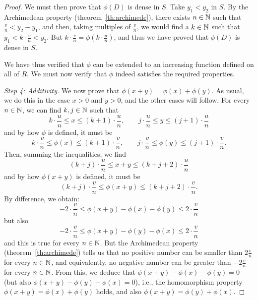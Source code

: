 \begin{proof}
We must then prove that $\phi(D)$ is dense in $S$. Take $y_1< y_2$ in $S$. By
the Archimedean property (theorem~\ref{th:archimede}), there exists $n\in {\mathbb N}$
such that $\frac v n < y_2-y_1$, and then, taking multiples of $\frac v n$, we
would find a $k\in{\mathbb N}$ such that $y_1 < k\cdot \frac v n < y_2$. But $k\cdot
\frac v n = \phi(k\cdot \frac u n)$, and thus we have proved that $\phi(D)$ is
dense in $S$.

We have thus verified that $\phi$ can be extended to an increasing function
defined on all of $R$. We must now verify that $\phi$ indeed satisfies the
required properties.


\emph{Step 4: Additivity.} We now prove that $\phi(x+y)=\phi(x)+\phi(y)$. As usual, we do this in the case $x>0$ and $y>0$, and the other cases will follow. For every $n\in {\mathbb N}$, we can find $k,j\in {\mathbb N}$ such that 
\[
  k\cdot \frac u n \le x \le (k+1)\cdot \frac u n, \qquad 
  j\cdot \frac u n \le y \le (j+1)\cdot \frac u n
\]
and by how $\phi$ is defined, it must be 
\[
  k\cdot \frac v n \le \phi(x) \le (k+1)\cdot\frac v n, \qquad  
  j\cdot \frac v n \le \phi(y) \le (j+1)\cdot\frac v n.
\]
Then, summing the inequalities, we find 
\[
  (k+j) \cdot \frac u n \le x + y \le (k+j+2) \cdot \frac u n  
\]
and by how $\phi(x+y)$ is defined, it must be 
\[
  (k+j)\cdot \frac v n \le \phi(x+y) \le (k+j+2)\cdot \frac v n.
\]
By difference, we obtain:
\[
 -2\cdot \frac v n \le \phi(x+y) - \phi(x) - \phi(y) \le 2\cdot \frac v n
\]
but also 
\[
 -2\cdot \frac v n \le \phi(x+y) - \phi(y) - \phi(x) \le 2\cdot \frac v n
\]
and this is true for every $n\in {\mathbb N}$. But the Archimedean property
(theorem~\ref{th:archimede}) tells us that no positive number can be smaller
than $2\frac v n$ for every $n\in {\mathbb N}$, and equivalently, no negative number can
be greater than $-2\frac v n$ for every $n\in {\mathbb N}$. From this, we deduce that
$\phi(x+y)-\phi(x)-\phi(y)=0$ (but also $\phi(x+y) - \phi(y)-\phi(x)=0$), i.e.,
the homomorphism property $\phi(x+y)=\phi(x) + \phi(y)$ holds, and also
$\phi(x+y) = \phi(y) + \phi(x)$.


\end{proof}
